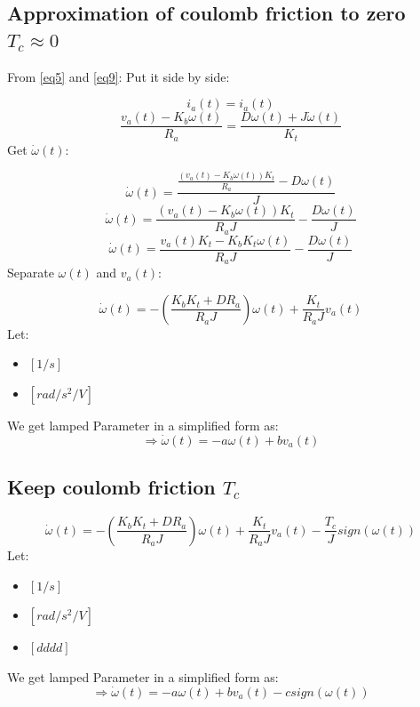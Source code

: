 \documentclass[12pt,a4paper]{article}
\begin{document}
	\subsection{Approximation of coulomb friction to zero \(T_c \approx 0\)}
	
	From \autoref{eq5} and \autoref{eq9}: Put it side by side:
	
	\[i_a(t) = i_a(t)\]
	\[\frac{v_a(t) - K_b \omega(t)}{R_a} = \frac{D\omega(t) + J \dot{\omega}(t)}{K_t}\]
	Get \(\dot{\omega}(t)\):
	
	\[\dot{\omega}(t) = \frac{\frac{(v_a(t) - K_b \omega(t))K_t}{R_a} - D\omega(t)}{J}\]
	\[\dot{\omega}(t) = \frac{(v_a(t) - K_b \omega(t))K_t}{R_a J} - \frac{D\omega(t)}{J}\]
	\[\dot{\omega}(t) = \frac{v_a(t) K_t - K_b K_t\omega(t)}{R_a J} - \frac{D\omega(t)}{J}\]
	Separate \(\omega(t)\) and \(v_a(t)\):

	\begin{equation}
		\boxed{\dot{\omega}(t) = - (\frac{K_b K_t + D R_a}{R_a J})\omega(t) + \frac{K_t}{R_a J}v_a(t)}
		\label{eq11}
	\end{equation}
	Let:
	\begin{itemize}
		\item { \([1/s]\) }
		\item { \([rad/s^2/V]\) }
	\end{itemize}
	We get lamped Parameter in a simplified form as:
	\begin{equation}
		\Rightarrow \boxed{\dot{\omega}(t) = - a\omega(t) + bv_a(t)}
		\label{eq12}
	\end{equation}


	\subsection{Keep coulomb friction \(T_c\)}
	\begin{equation}
		\boxed{\dot{\omega}(t) = - (\frac{K_b K_t + D R_a}{R_a J})\omega(t) + \frac{K_t}{R_a J}v_a(t) - \frac{T_c}{J}sign(\omega(t))}
		\label{eq13}
	\end{equation}
	Let:
	\begin{itemize}
		\item { \([1/s]\) }
		\item { \([rad/s^2/V]\) }
		\item { \([dddd]\) }
	\end{itemize}
	We get lamped Parameter in a simplified form as:
	\begin{equation}
		\Rightarrow \boxed{\dot{\omega}(t) = - a\omega(t) + bv_a(t) - csign(\omega(t))}
		\label{eq14}
	\end{equation}
\end{document}
